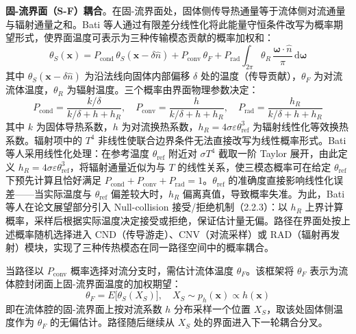 \textbf{固-流界面（S-F）耦合}。在固-流界面处，固体侧传导热通量等于流体侧对流通量与辐射通量之和。Bati 等人通过有限差分线性化将此能量守恒条件改写为概率期望形式，使界面温度可表示为三种传输模态贡献的概率加权和\cite{batiCouplingConductionConvection2023}：
\begin{equation}
  \theta_S(\mathbf{x}) = P_\text{cond}\,\theta_S(\mathbf{x}-\delta\hat{n})
  + P_\text{conv}\,\theta_F
  + P_\text{rad}\int_{2\pi}\theta_R\,\frac{\boldsymbol{\omega}\cdot\hat{n}}{\pi}\,\mathrm{d}\boldsymbol{\omega}
  \label{eq:interface_temp}
\end{equation}
其中 $\theta_S(\mathbf{x}-\delta\hat{n})$ 为沿法线向固体内部偏移 $\delta$ 处的温度（传导贡献），$\theta_F$ 为对流流体温度，$\theta_R$ 为辐射温度。三个概率由界面物理参数决定：
\begin{equation}
  P_\text{cond} = \frac{k/\delta}{k/\delta + h + h_R}, \quad
  P_\text{conv} = \frac{h}{k/\delta + h + h_R}, \quad
  P_\text{rad} = \frac{h_R}{k/\delta + h + h_R}
  \label{eq:interface_probs}
\end{equation}
其中 $k$ 为固体导热系数，$h$ 为对流换热系数，$h_R = 4\sigma\varepsilon\theta_\text{ref}^3$ 为辐射线性化等效换热系数。辐射项中的 $T^4$ 非线性使联合边界条件无法直接改写为线性概率形式。Bati 等人\cite{batiCouplingConductionConvection2023}采用线性化处理：在参考温度 $\theta_\text{ref}$ 附近对 $\sigma T^4$ 截取一阶 Taylor 展开，由此定义 $h_R = 4\sigma\varepsilon\theta_\text{ref}^3$，将辐射通量近似为与 $T$ 的线性关系，使三模态概率可在给定 $\theta_\text{ref}$ 下预先计算且恰好满足 $P_\text{cond} + P_\text{conv} + P_\text{rad} = 1$。$\theta_\text{ref}$ 的准确度直接影响线性化误差——当实际温度与 $\theta_\text{ref}$ 偏差较大时，$h_R$ 偏离真值，导致概率失准。为此，Bati 等人在论文展望部分引入 Null-collision 接受/拒绝机制（2.2.3）：以 $h_R$ 上界计算概率，采样后根据实际温度决定接受或拒绝，保证估计量无偏。路径在界面处按上述概率随机选择进入 CND（传导游走）、CNV（对流采样）或 RAD（辐射再发射）模块，实现了三种传热模态在同一路径空间中的概率耦合。

当路径以 $P_\text{conv}$ 概率选择对流分支时，需估计流体温度 $\theta_F$。该框架将 $\theta_F$ 表示为流体腔封闭面上固-流界面温度的加权期望\cite{batiCouplingConductionConvection2023}：
\begin{equation}
  \theta_F = E\bigl[\theta_S(X_S)\bigr], \quad X_S \sim p_h(\mathbf{x}) \propto h(\mathbf{x})
  \label{eq:fluid_temp}
\end{equation}
即在流体腔的固-流界面上按对流系数 $h$ 分布采样一个位置 $X_S$，取该处固体侧温度作为 $\theta_F$ 的无偏估计。路径随后继续从 $X_S$ 处的界面进入下一轮耦合分叉。

